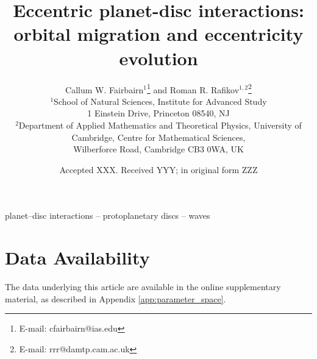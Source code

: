\documentclass[fleqn,usenatbib]{mnras}
\title[Eccentric planet-disc interactions]{Eccentric planet-disc interactions: orbital migration and eccentricity evolution}
\author[Fairbairn \& Rafikov]{
Callum W. Fairbairn$^{1}$\thanks{E-mail: cfairbairn@ias.edu}
and Roman R. Rafikov$^{1,2}$\thanks{E-mail: rrr@damtp.cam.ac.uk}
\\
$^{1}$School of Natural Sciences, Institute for Advanced Study\\
1 Einstein Drive, Princeton 08540, NJ\\
$^{2}$Department of Applied Mathematics and Theoretical Physics, University of Cambridge, Centre for Mathematical Sciences,\\
Wilberforce Road, Cambridge CB3 0WA, UK
}
\date{Accepted XXX. Received YYY; in original form ZZZ}
\begin{document}
\label{firstpage}
\pagerange{\pageref{firstpage}--\pageref{lastpage}}
\maketitle



\begin{keywords}
planet–disc interactions -- protoplanetary discs -- waves
\end{keywords}











\section*{Data Availability}

The data underlying this article are available in the online supplementary material, as described in Appendix \ref{app:parameter_space}.







\appendix


% 

% 



\bsp	%
\label{lastpage}
\end{document}

